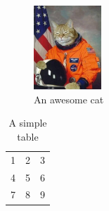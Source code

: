 \documentclass{article}
\begin{document}
\begin{figure}[h!]
  \centering
  \includegraphics[width=1in]{cat.jpg}
  \caption{An awesome cat}
\end{figure}

\begin{table}[h!]
  \begin{center}
    \begin{tabular}{| l c r |}
    \hline
    1 & 2 & 3 \\
    4 & 5 & 6 \\
    7 & 8 & 9 \\
    \hline
    \end{tabular}
  \end{center}
  \caption{A simple table}
\end{table}
\end{document}
